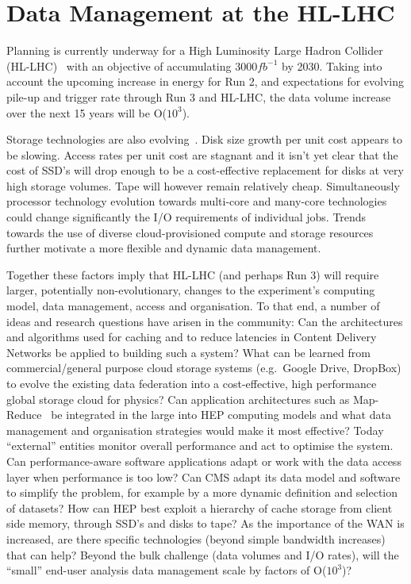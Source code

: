 \documentclass[a4paper]{jpconf}
\begin{document}
\section{Data Management at the HL-LHC}
Planning is currently underway for a High Luminosity Large Hadron
Collider (HL-LHC)~\cite{HLLHC} with an objective of accumulating
${3000fb^{-1}}$ by 2030. Taking into account the upcoming increase
in energy for Run 2, and expectations for evolving pile-up and
trigger rate through Run 3 and HL-LHC, the data volume increase
over the next 15 years will be O($10^3$).

Storage technologies are also evolving~\cite{SMSTORAGE}.  Disk size
growth per unit cost appears to be slowing. Access rates per unit
cost are stagnant and it isn't yet clear that the cost of SSD's
will drop enough to be a cost-effective replacement for disks at
very high storage volumes. Tape will however remain relatively
cheap. Simultaneously processor technology evolution towards
multi-core and many-core technologies~\cite{SMPROC} could change
significantly the I/O requirements of individual jobs. Trends towards
the use of diverse cloud-provisioned compute and storage
resources~\cite{SMEFCOMP} further motivate a more flexible and
dynamic data management.

Together these factors imply that HL-LHC (and perhaps Run 3) will
require larger, potentially non-evolutionary, changes to the
experiment's computing model, data management, access and organisation.
To that end, a number of ideas and research questions have arisen
in the community: Can the architectures and algorithms used for
caching and to reduce latencies in Content Delivery Networks be
applied to building such a system?  What can be learned from
commercial/general purpose cloud storage systems (e.g.\ Google
Drive, DropBox) to evolve the existing data federation into a
cost-effective, high performance global storage cloud for physics?
Can application architectures such as Map-Reduce~\cite{MAPREDUCE}
be integrated in the large into HEP computing models and what data
management and organisation strategies would make it most effective?
Today ``external'' entities monitor overall performance and act to
optimise the system. Can performance-aware software applications
adapt or work with the data access layer when performance is too
low? Can CMS adapt its data model and software to simplify the
problem, for example by a more dynamic definition and selection of
datasets? How can HEP best exploit a hierarchy of cache storage
from client side memory, through SSD's and disks to tape?  As the
importance of the WAN is increased, are there specific technologies
(beyond simple bandwidth increases) that can help?  Beyond the bulk
challenge (data volumes and I/O rates), will the ``small'' end-user
analysis data management scale by factors of O($10^3$)?
\end{document}
